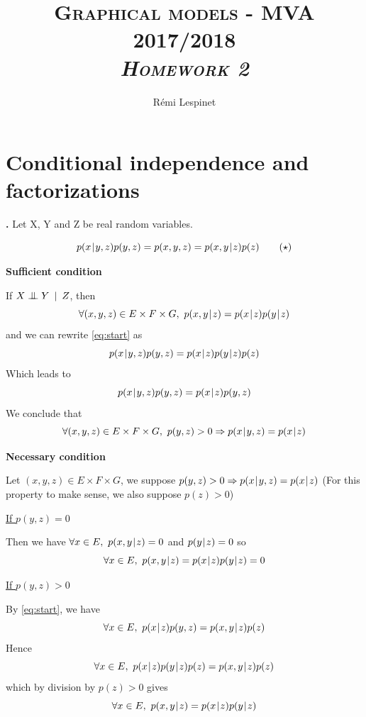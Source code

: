 \documentclass[a4paper, 11pt]{article}
\title{\textsc{Graphical models - MVA 2017/2018 \\ \emph{Homework 2}} }
\author{Rémi Lespinet}
\date{}
\newcounter{cquestion}[subsection]
\renewcommand{\thecquestion}{\arabic{cquestion}}
\newenvironment{question}
{\par \vspace{0.5em} \noindent \stepcounter{cquestion} \hspace{-1em}
 \textbf{\thecquestion.}}
{}
\newcommand{\bigCI}{\mathrel{\text{\scalebox{1.07}{$\perp\mkern-10mu\perp$}}}}
\newcommand{\indepcond}[3]{#1 \bigCI #2 \hspace{.5em} | \hspace{.5em} #3 }
\newcommand{\pcond}[2]{p(#1 \hspace{-.2em}\mid\hspace{-.2em} #2)}
\newcommand{\ipart}[1]{\vspace{0.5em}\textbf{#1}\vspace{0.5em}}
\begin{document}
\maketitle
\thispagestyle{fancy}

\section{Conditional independence and factorizations}

\begin{question}
Let X, Y and Z be real random variables.

\begin{equation}
  \pcond{x}{y, z} p(y, z) = p(x, y, z) = \pcond{x, y}{z} p(z)
  \label{eq:start}
  \tag{$\star$}
\end{equation}

\ipart{Sufficient condition}

If $\indepcond{X}{Y}{Z}$, then
\begin{equation*}
  \forall (x, y, z) \in E \times F \times G,\  \pcond{x, y}{z} = \pcond{x}{z} \pcond{y}{z}
\end{equation*}
and we can rewrite \eqref{eq:start} as
\begin{equation*}
  \pcond{x}{y, z} p(y, z) = \pcond{x}{z} \pcond{y}{z} p(z)
\end{equation*}
Which leads to
\begin{equation*}
  \pcond{x}{y, z} p(y, z) = \pcond{x}{z} p(y, z)
\end{equation*}
We conclude that
\begin{equation*}
  \forall (x, y, z) \in E \times F \times G,\ p(y, z) > 0 \Rightarrow \pcond{x}{y, z} = \pcond{x}{z}
\end{equation*}

\ipart{Necessary condition}

Let $(x, y, z) \in E \times F \times G$, we suppose
$p(y, z) > 0 \Rightarrow \pcond{x}{y, z} = \pcond{x}{z}$
(For this property to make sense, we also suppose $p(z) > 0$)

\underline{If $p(y, z) = 0$}

Then we have $\forall x \in E,\ \pcond{x, y}{z} = 0$ and $\pcond{y}{z} = 0$
so
\begin{equation*}
  \forall x \in E,\ \pcond{x, y}{z} = \pcond{x}{z} \pcond{y}{z} = 0
\end{equation*}


\underline{If $p(y, z) > 0$}

By \eqref{eq:start}, we have
\begin{equation*}
  \forall x \in E,\ \pcond{x}{z} p(y, z) = \pcond{x, y}{z} p(z)
\end{equation*}
Hence
\begin{equation*}
  \forall x \in E,\ \pcond{x}{z} \pcond{y}{z} p(z)  = \pcond{x, y}{z} p(z)
\end{equation*}
which by division by $p(z) > 0$ gives
\begin{equation*}
  \forall x \in E,\ \pcond{x, y}{z} = \pcond{x}{z} \pcond{y}{z}
\end{equation*}

\end{question}
\end{document}
